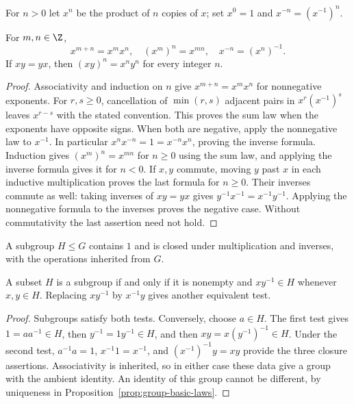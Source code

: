 For $n>0$ let $x^n$ be the product of $n$ copies of $x$; set $x^0=1$ and $x^{-n}=(x^{-1})^n$.
\begin{proposition}\label{prop:integer-powers}
For $m,n\in\Z$,
\[
 x^{m+n}=x^mx^n,\quad (x^m)^n=x^{mn},\quad x^{-n}=(x^n)^{-1}.
\]
If $xy=yx$, then $(xy)^n=x^ny^n$ for every integer $n$.
\end{proposition}
\begin{proof}
Associativity and induction on $n$ give $x^{m+n}=x^mx^n$ for nonnegative exponents. For $r,s\geq0$, cancellation of $\min(r,s)$ adjacent pairs in $x^r(x^{-1})^s$ leaves $x^{r-s}$ with the stated convention. This proves the sum law when the exponents have opposite signs. When both are negative, apply the nonnegative law to $x^{-1}$. In particular $x^nx^{-n}=1=x^{-n}x^n$, proving the inverse formula. Induction gives $(x^m)^n=x^{mn}$ for $n\geq0$ using the sum law, and applying the inverse formula gives it for $n<0$. If $x,y$ commute, moving $y$ past $x$ in each inductive multiplication proves the last formula for $n\geq0$. Their inverses commute as well: taking inverses of $xy=yx$ gives $y^{-1}x^{-1}=x^{-1}y^{-1}$. Applying the nonnegative formula to the inverses proves the negative case. Without commutativity the last assertion need not hold.
\end{proof}

\begin{definition}
A subgroup $H\leq G$ contains $1$ and is closed under multiplication and inverses, with the operations inherited from $G$.
\end{definition}
\begin{proposition}\label{prop:subgroup-test}
A subset $H$ is a subgroup if and only if it is nonempty and $xy^{-1}\in H$ whenever $x,y\in H$. Replacing $xy^{-1}$ by $x^{-1}y$ gives another equivalent test.
\end{proposition}
\begin{proof}
Subgroups satisfy both tests. Conversely, choose $a\in H$. The first test gives $1=aa^{-1}\in H$, then $y^{-1}=1y^{-1}\in H$, and then $xy=x(y^{-1})^{-1}\in H$. Under the second test, $a^{-1}a=1$, $x^{-1}1=x^{-1}$, and $(x^{-1})^{-1}y=xy$ provide the three closure assertions. Associativity is inherited, so in either case these data give a group with the ambient identity. An identity of this group cannot be different, by uniqueness in Proposition~\ref{prop:group-basic-laws}.
\end{proof}

